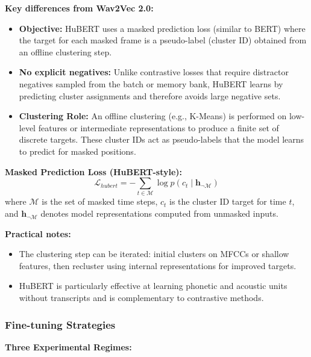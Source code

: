 \documentclass[conference]{IEEEtran}
\begin{document}
\textbf{Key differences from Wav2Vec 2.0:}
\begin{itemize}
  \item \textbf{Objective:} HuBERT uses a masked prediction loss (similar to BERT) where the target for each masked frame is a pseudo-label (cluster ID) obtained from an offline clustering step.
  \item \textbf{No explicit negatives:} Unlike contrastive losses that require distractor negatives sampled from the batch or memory bank, HuBERT learns by predicting cluster assignments and therefore avoids large negative sets.
  \item \textbf{Clustering Role:} An offline clustering (e.g., K-Means) is performed on low-level features or intermediate representations to produce a finite set of discrete targets. These cluster IDs act as pseudo-labels that the model learns to predict for masked positions.
\end{itemize}

\textbf{Masked Prediction Loss (HuBERT-style):}
\begin{equation}
\mathcal{L}_{hubert} = -\sum_{t \in \mathcal{M}} \log p(c_t \mid \mathbf{h}_{\neg \mathcal{M}})
\end{equation}
where $\mathcal{M}$ is the set of masked time steps, $c_t$ is the cluster ID target for time $t$, and $\mathbf{h}_{\neg \mathcal{M}}$ denotes model representations computed from unmasked inputs.

\textbf{Practical notes:}
\begin{itemize}
  \item The clustering step can be iterated: initial clusters on MFCCs or shallow features, then recluster using internal representations for improved targets.
  \item HuBERT is particularly effective at learning phonetic and acoustic units without transcripts and is complementary to contrastive methods.
\end{itemize}

\subsubsection{Fine-tuning Strategies}
\label{sec:q2_wav2vec_finetuning}

\textbf{Three Experimental Regimes:}
\end{document}
